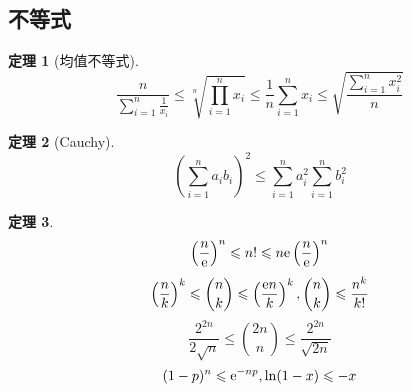 \documentclass[landscape, a4paper]{article}
\theoremstyle{compact}
\newtheorem{theorem}{定理}
\def\le{\leqslant}
\begin{document}
\begin{multicols}{3}
\section{不等式}
\begin{theorem}[均值不等式]
	$$\frac{n}{\sum_{i=1}^{n}\frac{1}{x_i}} \le \sqrt[n]{\prod_{i=1}^{n}x_i} \le \frac{1}{n}\sum_{i=1}^{n}x_i \le \sqrt{\frac{\sum_{i=1}^{n}x_i^2}{n}}$$
\end{theorem}
\begin{theorem}[Cauchy]
	$$\left( \sum_{i=1}^{n}a_ib_i \right)^2 \le \sum_{i=1}^{n}a_i^2\sum_{i=1}^{n}b_i^2$$
\end{theorem}
\begin{theorem}
	$$\left(\frac {n}{\text e}\right)^n \le n! \le n\text e\left(\frac {n}{\text e}\right)^n$$
	$$\left(\frac {n}{k}\right)^k \le \binom nk \le \left(\frac {\text en}{k}\right)^k, \binom nk \le \frac{n^k}{k!}$$
	$$\frac{2^{2n}}{2\sqrt n} \le \binom{2n}{n} \le \frac{2^{2n}}{\sqrt{2n}}$$
	$$(1 - p)^n \le \text e^{-np}, \ln(1 - x) \le -x$$
\end{theorem}

\end{multicols}
\end{document}
